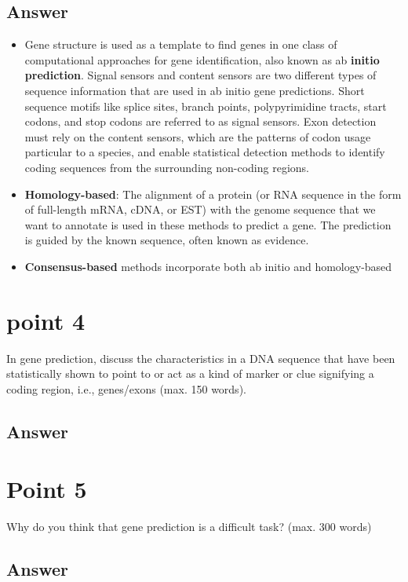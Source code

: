 \documentclass{article}
\begin{document}
\subsection*{Answer}
\begin{itemize}
    \item Gene structure is used as a template to find genes in one class of computational approaches for gene identification, also known as ab \textbf{initio prediction}. Signal sensors and content sensors are two different types of sequence information that are used in ab initio gene predictions. Short sequence motifs like splice sites, branch points, polypyrimidine tracts, start codons, and stop codons are referred to as signal sensors. Exon detection must rely on the content sensors, which are the patterns of codon usage particular to a species, and enable statistical detection methods to identify coding sequences from the surrounding non-coding regions.
    \item \textbf{Homology-based}: The alignment of a protein (or RNA sequence in the form of full-length mRNA, cDNA, or EST) with the genome sequence that we want to annotate is used in these methods to predict a gene. The prediction is guided by the known sequence, often known as evidence.
    \item \textbf{Consensus-based} methods incorporate both ab initio and homology-based 
\end{itemize}

\section{point 4}
In gene prediction, discuss the characteristics in a DNA sequence that have been
statistically shown to point to or act as a kind of marker or clue signifying a coding
region, i.e., genes/exons (max. 150 words).
\subsection*{Answer}

\section{Point 5}
Why do you think that gene prediction is a difficult task? (max. 300 words)
\subsection*{Answer}
\end{document}
